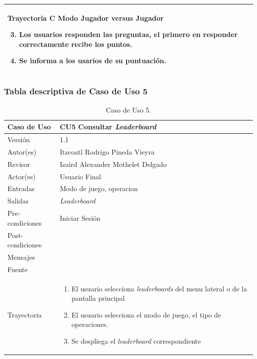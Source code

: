 \documentclass{article}
\begin{document}
\begin{table}[H]
\begin{tabular}{|M{4cm}|M{12cm}|}
Trayectoria C Modo Jugador versus Jugador
\begin{enumerate}
\setcounter{enumi}{2}
\item Los usuarios responden las preguntas, el primero en responder correctamente recibe los puntos. 
\item Se informa a los usarios de su puntuación.
\end{enumerate} \\ \hline 
\end{tabular}
\end{table}

\subsubsection{Tabla descriptiva de Caso de Uso 5}
\begin{table}[H]
\caption{Caso de Uso 5.}
\begin{tabular}{|M{4cm}|M{12cm}|}
\hline
Caso de Uso & CU5 Consultar \emph{Leaderboard}\\ \hline
Versión & 1.1\\ \hline
Autor(es) & Itzcoatl Rodrigo Pineda Vieyra\\ \hline
Revisor & Izaird Alexander Mothelet Delgado \\ \hline
Actor(es) & Usuario Final \\ \hline
Entradas &  Modo de juego, operacion \\ \hline
Salidas & \emph{Leaderboard} \\ \hline
Pre-condiciones & Iniciar Sesión\\ \hline
Post-condiciones & \\ \hline
Mensajes & \\ \hline 
Fuente &  \\ \hline	
Trayectoria &
\begin{enumerate}
\item El usuario selecciona \emph{leaderboards} del menu lateral o de la pantalla principal 
\item El usuario selecciona el modo de juego, el tipo de operaciones.
\item Se despliega el \emph{leaderboard} correspondiente
\end{enumerate}
\\ \hline
\end{tabular}
\end{table}
\end{document}
